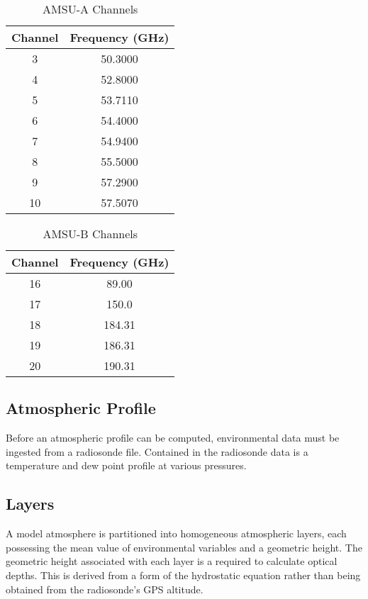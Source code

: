 \documentclass[twocol]{ametsoc}
\begin{document}
\begin{table}
	\centering
	\caption{AMSU-A Channels}
	\begin{tabular}{cc}
		\toprule
		Channel	& Frequency (GHz)\\
		\midrule
	    3 & 50.3000 \\
	    4 & 52.8000 \\
	    5 & 53.7110 \\
	    6 & 54.4000 \\
	    7 & 54.9400 \\
	    8 & 55.5000 \\
	    9 & 57.2900 \\
	    10 & 57.5070 \\
	    \bottomrule
	\end{tabular}
	\label{tab:amsua}
\end{table}

\begin{table}
	\centering
	\caption{AMSU-B Channels}
	\begin{tabular}{cc}
		\toprule
		Channel	& Frequency (GHz)\\
		\midrule
		16 & 89.00 \\
		17 & 150.0 \\
		18 & 184.31 \\
		19 & 186.31 \\
		20 & 190.31 \\
	    \bottomrule
	\end{tabular}
	\label{tab:amsub}
\end{table}

\subsection{Atmospheric Profile}

Before an atmospheric profile can be computed, environmental data must be ingested from a radiosonde file.
Contained in the radiosonde data is a temperature and dew point profile at various pressures.

\subsection{Layers}

A model atmosphere is partitioned into homogeneous atmospheric layers, each possessing the mean value of environmental variables and a geometric height.
The geometric height associated with each layer is a required to calculate optical depths.
This is derived from a form of the hydrostatic equation rather than being obtained from the radiosonde's GPS altitude.
\end{document}
